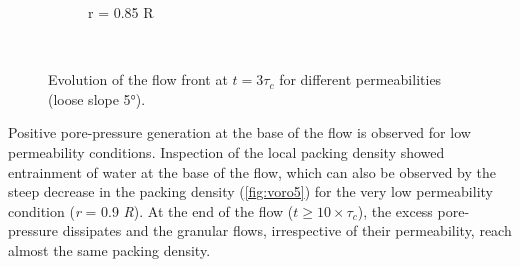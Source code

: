 \documentclass[12pt,twoside]{tuhhproc-en}
\begin{document}
\begin{figure}
{\begin{subfigure}[b]{0.95\textwidth}
    \caption{r = 0.85 R}
    \label{fig:LBM_660_Slope5_r085}
\end{subfigure}
}\\
\caption{Evolution of the flow front at $t = 3\tau_c$ for different 
permeabilities (loose slope 5\si{\degree}).}
\label{fig:slope_loose_5}
\end{figure}

Positive pore-pressure generation at the base of the flow is observed for low 
permeability conditions. Inspection of the local packing density showed 
entrainment of water at the base of the flow, which can also be observed by the 
steep decrease in the packing density (\cref{fig:voro5}) for the very low 
permeability condition (\textit{r} = 0.9 \textit{R}). At the end of the flow 
($t \ge 10 \times \tau_c$), the excess pore-pressure dissipates and the 
granular flows, irrespective of their permeability, reach almost the same 
packing density.
\end{document}
